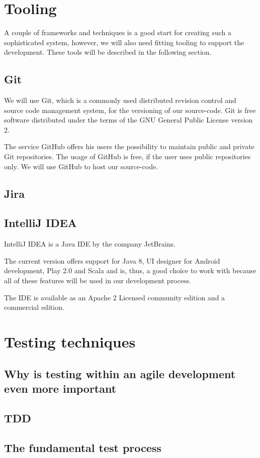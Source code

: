 \section{Tooling}
A couple of frameworks and techniques is a good start for creating such a sophisticated system, however, we will also need fitting tooling to support the development. These tools will be described in the following section.

\subsection{Git}
We will use Git, which is a commonly used distributed revision control and source code management system, for the versioning of our source-code. Git is free software distributed under the terms of the GNU General Public License version 2.

The service GitHub offers his users the possibility to maintain public and private Git repositories. The usage of GitHub is free, if the user uses public repositories only. We will use GitHub to host our source-code.

\subsection{Jira}

\subsection{IntelliJ IDEA}
IntelliJ IDEA is a Java \ac{IDE} by the company JetBrains. 

The current version offers support for Java 8, UI designer for Android development, Play 2.0 and Scala and is, thus, a good choice to work with because all of these features will be used in our development process.

The \ac{IDE} is available as an Apache 2 Licensed community edition and a commercial edition.

\section{Testing techniques}	

\subsection{Why is testing within an agile development even more important}

\subsection{TDD}

\subsection{The fundamental test process}